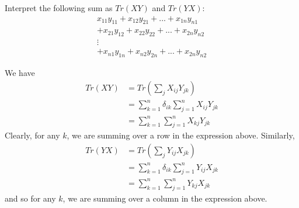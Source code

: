 \documentclass[12pt,onecolumn]{article}
\begin{document}
\begin{exercise}
Interpret the following sum as $Tr(XY)$ and $Tr(YX)$:
\begin{align*}
      x_{11}y_{11} +  x_{12}y_{21} + ... +  x_{1n}y_{n1}\\
    + x_{21}y_{12} +  x_{22}y_{22} + ... +  x_{2n}y_{n2}\\
    \vdots \quad \\
    + x_{n1}y_{1n} +  x_{n2}y_{2n} + ... +  x_{2n}y_{n2}
\end{align*}
\end{exercise}
\begin{answer}
We have
\begin{align*}
    Tr(XY) &= Tr(\sum_j X_{ij}Y_{jk}) \\
    &= \sum_{k=1}^n \delta_{ik}\sum_{j=1}^n X_{ij}Y_{jk} \\
    &= \sum_{k=1}^n\sum_{j=1}^n  X_{kj}Y_{jk}
\end{align*}
Clearly, for any $k$, we are summing over a row in the expression above. Similarly,
\begin{align*}
    Tr(YX) &= Tr(\sum_j Y_{ij}X_{jk}) \\
    &= \sum_{k=1}^n \delta_{ik}\sum_{j=1}^n Y_{ij}X_{jk} \\
    &= \sum_{k=1}^n\sum_{j=1}^n  Y_{kj}X_{jk}
\end{align*}
and so for any $k$, we are summing over a column in the expression above.
\end{answer}
\end{document}
